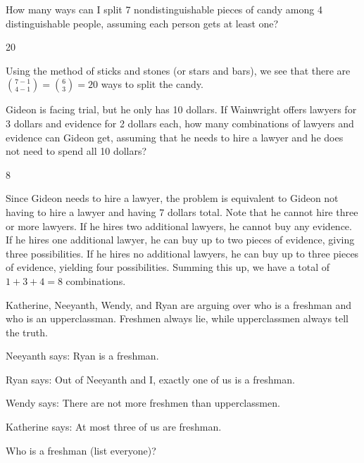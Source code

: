 \documentclass[11pt]{article}
\begin{document}
\begin{problem}
How many ways can I split 7 nondistinguishable pieces of candy among 4 distinguishable people, assuming each person gets at least one?
\end{problem}

\begin{answer}
20
\end{answer}

\begin{solution}
Using the method of sticks and stones (or stars and bars), we see that there are ${{7-1} \choose {4-1}} = {6 \choose 3} = \boxed{20}$ ways to split the candy.
\end{solution}

\begin{problem}
Gideon is facing trial, but he only has 10 dollars. If Wainwright offers lawyers for 3 dollars and evidence for 2 dollars each, how many combinations of lawyers and evidence can Gideon get, assuming that he needs to hire a lawyer and he does not need to spend all 10 dollars?
\end{problem}

\begin{answer}
8
\end{answer}

\begin{solution}
Since Gideon needs to hire a lawyer, the problem is equivalent to Gideon not having to hire a lawyer and having 7 dollars total. 
Note that he cannot hire three or more lawyers. If he hires two additional lawyers, he cannot buy any evidence. 
If he hires one additional lawyer, he can buy up to two pieces of evidence, giving three possibilities. 
If he hires no additional lawyers, he can buy up to three pieces of evidence, yielding four possibilities. 
Summing this up, we have a total of $1+3+4=\boxed{8}$ combinations.
\end{solution}

\begin{problem}
Katherine, Neeyanth, Wendy, and Ryan are arguing over who is a freshman and who is an upperclassman. Freshmen always lie, while upperclassmen always tell the truth. 
    
Neeyanth says: Ryan is a freshman.
    
Ryan says: Out of Neeyanth and I, exactly one of us is a freshman.

Wendy says: There are not more freshmen than upperclassmen.
    
Katherine says: At most three of us are freshman.
    
\noindent Who is a freshman (list everyone)?
\end{problem}
\end{document}
